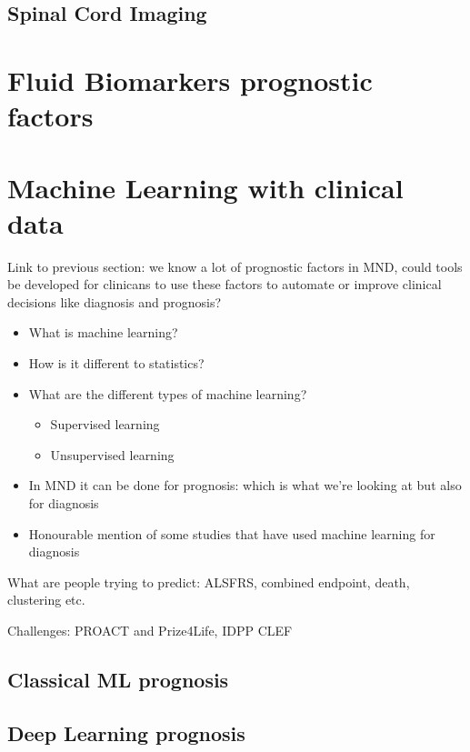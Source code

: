 \subsection{Spinal Cord Imaging}

\section{Fluid Biomarkers prognostic factors}


\section{Machine Learning with clinical data}

Link to previous section: we know a lot of prognostic factors in MND, could tools be developed for clinicans to use these factors to automate or improve clinical decisions like diagnosis and prognosis?


\begin{itemize}
    \item What is machine learning?
    \item How is it different to statistics?
    \item What are the different types of machine learning?
    \begin{itemize}
        \item Supervised learning
        \item Unsupervised learning
    \end{itemize}
    \item In MND it can be done for prognosis: which is what we're looking at but also for diagnosis
    \item Honourable mention of some studies that have used machine learning for diagnosis
\end{itemize}

What are people trying to predict: ALSFRS, combined endpoint, death, clustering etc.

Challenges: PROACT and Prize4Life, IDPP CLEF

\subsection{Classical ML prognosis}

\subsection{Deep Learning prognosis}

